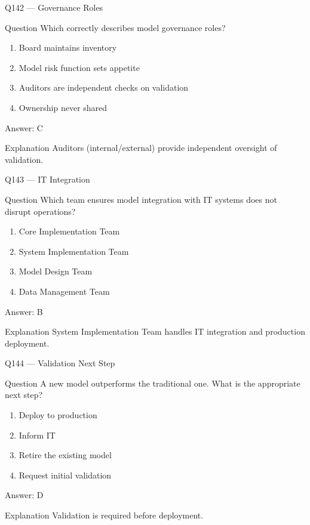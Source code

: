 \documentclass[aspectratio=169,8pt]{beamer}
\begin{document}
	\begin{frame}{Q142 --- Governance Roles}
		\begin{block}{Question}
			Which correctly describes model governance roles?
		\end{block}
		\begin{enumerate}
			\item Board maintains inventory
			\item Model risk function sets appetite
			\item Auditors are independent checks on validation
			\item Ownership never shared
		\end{enumerate}
		\begin{exampleblock}{Answer: C}\end{exampleblock}
		\begin{block}{Explanation}
			Auditors (internal/external) provide independent oversight of validation.
		\end{block}
	\end{frame}
	
	\begin{frame}{Q143 --- IT Integration}
		\begin{block}{Question}
			Which team ensures model integration with IT systems does not disrupt operations?
		\end{block}
		\begin{enumerate}
			\item Core Implementation Team
			\item System Implementation Team
			\item Model Design Team
			\item Data Management Team
		\end{enumerate}
		\begin{exampleblock}{Answer: B}\end{exampleblock}
		\begin{block}{Explanation}
			System Implementation Team handles IT integration and production deployment.
		\end{block}
	\end{frame}
	
	\begin{frame}{Q144 --- Validation Next Step}
		\begin{block}{Question}
			A new model outperforms the traditional one. What is the appropriate next step?
		\end{block}
		\begin{enumerate}
			\item Deploy to production
			\item Inform IT
			\item Retire the existing model
			\item Request initial validation
		\end{enumerate}
		\begin{exampleblock}{Answer: D}\end{exampleblock}
		\begin{block}{Explanation}
			Validation is required before deployment.
		\end{block}
	\end{frame}
	
\end{document}
